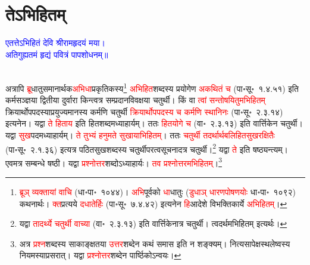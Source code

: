 \section[तेऽभिहितम्]{तेऽभिहितम्‌}
\centering\textcolor{blue}{एतत्तेऽभिहितं देवि श्रीरामहृदयं मया।\nopagebreak\\
अतिगुह्यतमं हृद्यं पवित्रं पापशोधनम्॥}\nopagebreak\\
\\
\begin{sloppypar}\justifying\noindent\hspace{10mm} अत्रापि \textcolor{red}{ब्रू}\-धातु\-समानार्थक\-\textcolor{red}{अभिधा}\-प्रकृतिकस्य\footnote{\textcolor{red}{ब्रूञ् व्यक्तायां वाचि} (धा॰पा॰~१०४४)। \textcolor{red}{अभि}\-पूर्वको \textcolor{red}{धा}\-धातुः (\textcolor{red}{डुधाञ् धारण\-पोषणयोः} धा॰पा॰~१०९२) कथनार्थः। \textcolor{red}{क्त}प्रत्यये \textcolor{red}{दधातेर्हिः} (पा॰सू॰~७.४.४२) इत्यनेन \textcolor{red}{हि}आदेशे विभक्तिकार्ये \textcolor{red}{अभिहितम्}।} \textcolor{red}{अभिहित}\-शब्दस्य प्रयोगेण \textcolor{red}{अकथितं च} (पा॰सू॰~१.४.५१) इति कर्म\-सञ्ज्ञया द्वितीया दुर्वारा किन्त्वत्र सम्प्रदान\-विवक्षया चतुर्थी। किं वा \textcolor{red}{त्वां सन्तोषयितुमभिहितम्‌} क्रियार्थोप\-पदस्याप्रयुज्यमानस्य कर्मणि चतुर्थी \textcolor{red}{क्रियार्थोपपदस्य च कर्मणि स्थानिनः} (पा॰सू॰~२.३.१४) इत्यनेन। यद्वा \textcolor{red}{ते हिताय} इति हित\-शब्दमध्याहार्यम्। ततः \textcolor{red}{हित\-योगे च} (वा॰~२.३.१३) इति वार्त्तिकेन चतुर्थी। यद्वा \textcolor{red}{सुख}पदमध्याहार्यम्। \textcolor{red}{ते तुभ्यं हनुमते सुखायाभिहितम्‌}। ततः \textcolor{red}{चतुर्थी तदर्थार्थ\-बलि\-हित\-सुख\-रक्षितैः} (पा॰सू॰~२.१.३६) इत्यत्र पठित\-सुख\-शब्दस्य चतुर्थी\-परत्व\-सूचनादत्र चतुर्थी।\footnote{यद्वा \textcolor{red}{तादर्थ्ये चतुर्थी वाच्या} (वा॰~२.३.१३) इति वार्त्तिकेनात्र चतुर्थी। त्वदर्थमभिहितम् इत्यर्थः।} यद्वा \textcolor{red}{ते} इति षष्ठ्यन्त्यम्। एवमत्र सम्बन्धे षष्ठी। यद्वा \textcolor{red}{प्रश्नोत्तर}\-शब्दोऽध्याहार्यः। \textcolor{red}{तव प्रश्नोत्तरमभिहितम्‌}।\footnote{अत्र \textcolor{red}{प्रश्न}\-शब्दस्य साकाङ्क्षतया \textcolor{red}{उत्तर}\-शब्देन कथं समास इति न शङ्क्यम्। नित्य\-सापेक्षस्थलेष्वस्य नियमस्याप्रसरात्। यद्वा \textcolor{red}{प्रश्नोत्तर}\-शब्देन पार्ष्ठिकोऽन्वयः।}\end{sloppypar}
